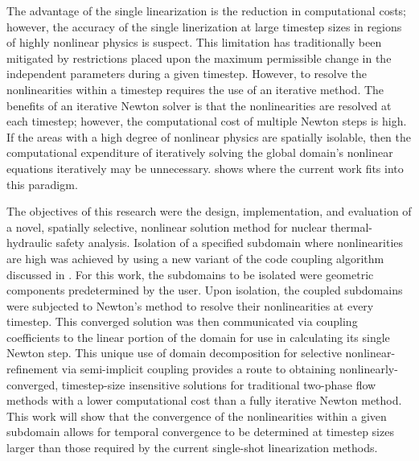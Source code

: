 The advantage of the single linearization is the reduction in computational costs; however, the accuracy of the single linerization at large timestep sizes in regions of highly nonlinear physics is suspect.
This limitation has traditionally been mitigated by restrictions placed upon the maximum permissible change in the independent parameters during a given timestep.
However, to resolve the nonlinearities within a timestep requires the use of an iterative method.
The benefits of an iterative Newton solver is that the nonlinearities are resolved at each timestep; however, the computational cost of multiple Newton steps is high.
If the areas with a high degree of nonlinear physics are spatially isolable, then the computational expenditure of iteratively solving the global domain's nonlinear equations iteratively may be unnecessary.
 shows where the current work fits into this paradigm.

The objectives of this research were the design, implementation, and evaluation of a novel, spatially selective, nonlinear solution method for nuclear thermal-hydraulic safety analysis.
Isolation of a specified subdomain where nonlinearities are high was achieved by using a new variant of the code coupling algorithm discussed in .
For this work, the subdomains to be isolated were geometric components predetermined by the user.
Upon isolation, the coupled subdomains were subjected to Newton's method to resolve their nonlinearities at every timestep.
This converged solution was then communicated via coupling coefficients to the linear portion of the domain for use in calculating its single Newton step.
This unique use of domain decomposition for selective nonlinear-refinement via semi-implicit coupling provides a route to obtaining nonlinearly-converged, timestep-size insensitive solutions for traditional two-phase flow methods with a lower computational cost than a fully iterative Newton method.
This work will show that the convergence of the nonlinearities within a given subdomain allows for temporal convergence to be determined at timestep sizes larger than those required by the current single-shot linearization methods.

